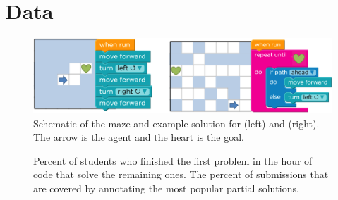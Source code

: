 \section{Data}

\begin{figure}
\centering
\includegraphics[width=1.0\columnwidth]{img/problems3.png}

\caption[Schematic of Code.org problems]{Schematic of the maze and example solution for \Pa (left) and \Pb (right). The arrow is the agent and the heart is the goal.}
\label{fig:hocExample}
\end{figure}

\begin{figure}
\centering
{}

\caption[Overview of Code.org data]{
 Percent of students who finished the first problem in the hour of code that solve the remaining ones.
  The percent of submissions that are covered by annotating the most popular partial solutions. 
 }
\label{tab:predacc}
\end{figure}


